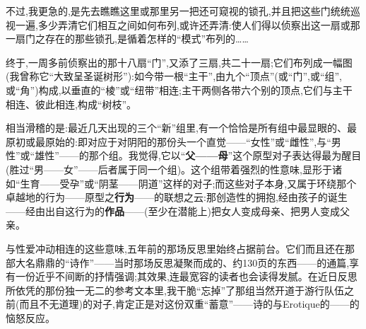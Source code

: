 不过,我更急的,是先去瞧瞧这里或那里另一把还可窥视的锁孔,并且把这些门统统巡视一遍,多少弄清它们相互之间如何布列,或许还弄清:使人们得以侦察出这一扇或那一扇门之存在的那些锁孔,是循着怎样的“模式”布列的……

终于,一周多前侦察出的那十八扇“门”,又添了三扇,共二十一扇;它们布列成一幅图(我曾称它“大致呈圣诞树形”):如今带一根“主干”,由九个“顶点”(或“门”,或“组”,或“角”)构成,以垂直的“棱”或“纽带”相连;主干两侧各带六个别的顶点,它们与主干相连、彼此相连,构成“树枝”\dmark{}。

相当滑稽的是:最近几天出现的三个“新”组里,有一个恰恰是所有组中最显眼的、最原初或最原始的:即对应于对阴阳的那份头一个直觉——“女性”或“雌性”,与“男性”或“雄性”——的那个组。我觉得,它以“\textbf{父——母}”这个原型对子表达得最为醒目(胜过“男——女”——后者属于同一个组)。这个组带着强烈的性意味,显形于诸如“生育——受孕”或“阴茎——阴道”这样的对子;而这些对子本身,又属于环绕那个卓越地的行为——原型之\textbf{行为}——的联想之云:那创造性的拥抱,经由孩子的诞生——经由出自这行为的\textbf{作品}——(至少在潜能上)把女人变成母亲、把男人变成父亲。

与性爱冲动相连的这些意味,五年前的那场反思里始终占据前台。它们而且还在那部大名鼎鼎的“诗作”——当时那场反思凝聚而成的、约130页的东西——的通篇,享有一份近乎不间断的抒情强调;其效果,连最宽容的读者也会读得发腻。在近日反思所依凭的那份独一无二的参考文本里,我干脆“忘掉”了那组当然开道于游行队伍之前(而且不无道理)的对子,肯定正是对这份双重“蓄意”——诗的与Erotique的——的恼怒反应。

